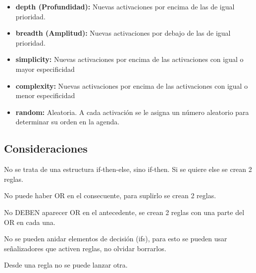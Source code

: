 \documentclass[12pt, twoside, openright]{report} %
\begin{document}
\begin{itemize}
	\item \textbf{depth (Profundidad):} Nuevas activaciones por encima de las de igual prioridad.
	\item \textbf{breadth (Amplitud):} Nuevas activaciones por debajo de las de igual prioridad.
	\item \textbf{simplicity:} Nuevas activaciones por encima de las activaciones con igual o mayor especificidad
	\item \textbf{complexity:} Nuevas activaciones por encima de las activaciones con igual o menor especificidad
	\item \textbf{random:} Aleatoria. A cada activación se le asigna un número aleatorio para determinar su orden en la agenda.
\end{itemize}

\subsection{Consideraciones}
No se trata de una estructura if-then-else, sino if-then. Si se quiere else se crean 2 reglas.

No puede haber OR en el consecuente, para suplirlo se crean 2 reglas.

No DEBEN aparecer OR en el antecedente, se crean 2 reglas con una parte del OR en cada una.

No se pueden anidar elementos de decisión (ifs), para esto se pueden usar señalizadores que activen reglas, no olvidar borrarlos.

Desde una regla no se puede lanzar otra.
\end{document}
